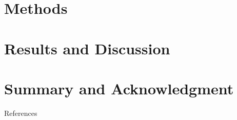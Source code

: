 \section{Methods}\placelogofalse
\placelogotrue
\section{Results and Discussion}\placelogofalse
\placelogotrue
\section{Summary and Acknowledgment}\placelogofalse
	
\appendix
\placelogofalse
\begin{frame}[allowframebreaks]{References}
\printbibliography
\end{frame}

